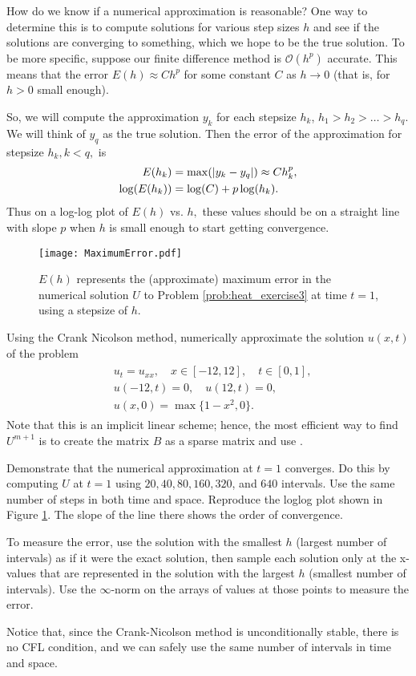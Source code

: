 How do we know if a numerical approximation is reasonable?
One way to determine this is to compute solutions for various step sizes $h$ and see if the solutions are converging to something, which we hope to be the true solution.
To be more specific, suppose our finite difference method is $\mathcal{O}(h^p)$ accurate.
This means that the error $E(h) \approx Ch^p$ for some constant $C$ as $h \to 0$ (that is, for $h>0$ small enough).

So, we will compute the approximation $y_k$ for each stepsize $h_k$, $h_1 > h_2> \ldots>h_q.$
We will think of $y_q$ as the true solution.
Then the error of the approximation for stepsize $h_k, k < q,$ is
\begin{align*}
	E(h_k) &= \max( \left\lvert y_k - y_q\right\rvert) \approx C h_k^p ,\\
	\log(E(h_k)) &= \log(C) + p \log(h_k).
\end{align*}
Thus on a log-log plot of $E(h)$ vs. $h,$ these values should be on a straight line with slope $p$ when $h$ is small enough to start getting convergence.

\begin{figure}
\centering
\texttt{[image: MaximumError.pdf]}
\caption{$E(h)$ represents the (approximate) maximum error in the numerical solution $U$ to Problem \ref{prob:heat_exercise3} at time $t=1$, using a stepsize of $h$.}
\label{fig:heatexercise3}
\end{figure}

\begin{problem}
\label{prob:heat_exercise3}
Using the Crank Nicolson method, numerically approximate the solution $u(x,t)$ of the problem
\begin{align}
	\begin{split}
	&{ } u_t = u_{xx}, \quad x \in [-12,12],\quad t \in [0,1],\\
	&{ } u(-12,t) = 0,\quad u(12,t) = 0,\\
	&{ } u(x,0) = \max\{1 - x^2,0\}.
	\end{split}
\end{align}
Note that this is an implicit linear scheme; hence, the most efficient way to find \(U^{m+1}\) is to create the matrix \(B\) as a sparse matrix and use .

Demonstrate that the numerical approximation at $t = 1$ converges.
Do this by computing $U$ at $t=1$ using $20,40,80,160,320$, and $640$ intervals.
Use the same number of steps in both time and space.
Reproduce the loglog plot shown in Figure \ref{fig:heatexercise3}.
The slope of the line there shows the order of convergence.

To measure the error, use the solution with the smallest $h$ (largest number of intervals) as if it were the exact solution, then sample each solution only at the x-values that are represented in the solution with the largest $h$ (smallest number of intervals).
Use the $\infty$-norm on the arrays of values at those points to measure the error.

Notice that, since the Crank-Nicolson method is unconditionally stable, there is no CFL condition, and we can safely use the same number of intervals in time and space.
\end{problem}